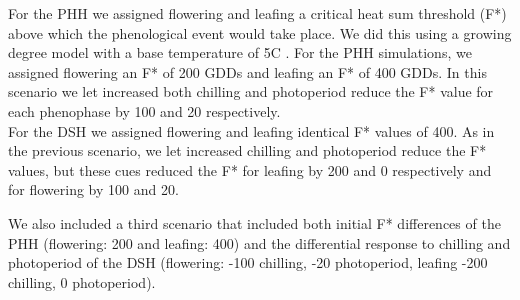 \documentclass[11pt]{article}
\begin{document}
\noindent For the PHH we assigned flowering and leafing a critical heat sum threshold (F*) above which the phenological event would take place. We did this using a growing degree model with a base temperature of 5\degree C \citep{}. For the PHH simulations, we assigned flowering an F* of 200 GDDs and leafing an F* of 400 GDDs. In this scenario we let increased both chilling and photoperiod reduce the F* value for each phenophase by 100 and 20 respectively.\\

\noindent For the DSH we assigned flowering and leafing identical F* values of 400. As in the previous scenario, we let increased chilling and photoperiod reduce the F* values, but these cues reduced the F* for leafing by 200 and 0 respectively and for flowering by 100 and 20.

\noindent We also included a third scenario that included both initial F* differences of the PHH (flowering: 200 and leafing: 400) and the differential response to chilling and photoperiod of the DSH (flowering: -100 chilling, -20 photoperiod, leafing -200 chilling, 0 photoperiod).

 
\end{document}
